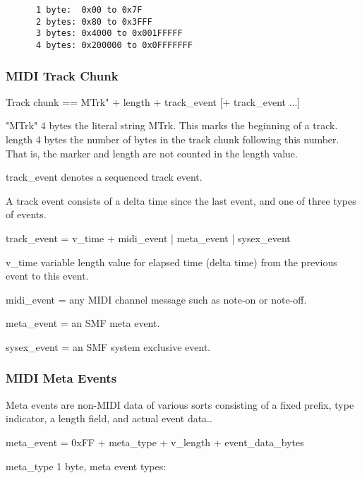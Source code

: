    \begin{verbatim}
      1 byte:  0x00 to 0x7F
      2 bytes: 0x80 to 0x3FFF
      3 bytes: 0x4000 to 0x001FFFFF
      4 bytes: 0x200000 to 0x0FFFFFFF
   \end{verbatim}

\subsubsection{MIDI Track Chunk}
\label{subsec:midi_track_chunk}

Track chunk == MTrk" + length + track\_event [+ track\_event ...]

"MTrk" 4 bytes the literal string MTrk. This marks the beginning of a track.
length 4 bytes the number of bytes in the track chunk following this number.
That is, the marker and length are not counted in the length value.

track\_event denotes a sequenced track event.

A track event consists of a delta time since the last event, and one of three
types of events.
 
track\_event = v\_time + midi\_event | meta\_event | sysex\_event
 
v\_time variable length value for elapsed time (delta time) from the previous
event to this event.

midi\_event = any MIDI channel message such as note-on or note-off.

meta\_event = an SMF meta event.

sysex\_event = an SMF system exclusive event.

\subsubsection{MIDI Meta Events}
\label{subsec:midi_meta_events}

Meta events are non-MIDI data of various sorts consisting of a fixed prefix,
type indicator, a length field, and actual event data..
 
   meta\_event = 0xFF + meta\_type + v\_length + event\_data\_bytes

meta\_type 1 byte, meta event types:

